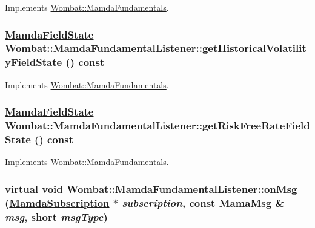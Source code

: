 Implements \hyperlink{classWombat_1_1MamdaFundamentals_86af2cf92e30784822ef88cd2d8d8718}{Wombat::Mamda\-Fundamentals}.\hypertarget{classWombat_1_1MamdaFundamentalListener_54c2f1ccf72199c1bff116b9e4a43992}{
\subsubsection[getHistoricalVolatilityFieldState]{\setlength{\rightskip}{0pt plus 5cm}\hyperlink{namespaceWombat_93aac974f2ab713554fd12a1fa3b7d2a}{Mamda\-Field\-State} Wombat::Mamda\-Fundamental\-Listener::get\-Historical\-Volatility\-Field\-State () const}}
\label{classWombat_1_1MamdaFundamentalListener_54c2f1ccf72199c1bff116b9e4a43992}




Implements \hyperlink{classWombat_1_1MamdaFundamentals_239218fdf3b49bf438ae252d6db488fb}{Wombat::Mamda\-Fundamentals}.\hypertarget{classWombat_1_1MamdaFundamentalListener_d93a5a6643c4f7c742aa588268ba646f}{
\subsubsection[getRiskFreeRateFieldState]{\setlength{\rightskip}{0pt plus 5cm}\hyperlink{namespaceWombat_93aac974f2ab713554fd12a1fa3b7d2a}{Mamda\-Field\-State} Wombat::Mamda\-Fundamental\-Listener::get\-Risk\-Free\-Rate\-Field\-State () const}}
\label{classWombat_1_1MamdaFundamentalListener_d93a5a6643c4f7c742aa588268ba646f}




Implements \hyperlink{classWombat_1_1MamdaFundamentals_7551c3b1d9b0eba452270f4cf7627976}{Wombat::Mamda\-Fundamentals}.\hypertarget{classWombat_1_1MamdaFundamentalListener_806eae8cea0dfe171fd85662eb1b2297}{
\subsubsection[onMsg]{\setlength{\rightskip}{0pt plus 5cm}virtual void Wombat::Mamda\-Fundamental\-Listener::on\-Msg (\hyperlink{classWombat_1_1MamdaSubscription}{Mamda\-Subscription} $\ast$ {\em subscription}, const Mama\-Msg \& {\em msg}, short {\em msg\-Type})}}
\label{classWombat_1_1MamdaFundamentalListener_806eae8cea0dfe171fd85662eb1b2297}


